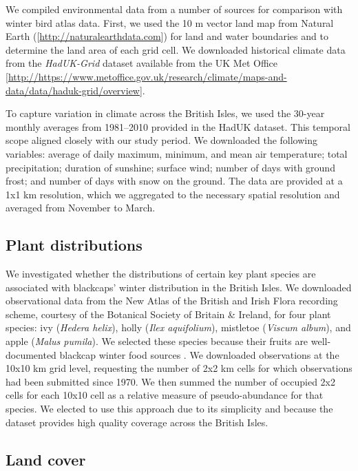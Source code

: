 \documentclass[a4paper, twoside]{templates/ociamthesis}
\begin{document}
We compiled environmental data from a number of sources for comparison with winter bird atlas data. First, we used the 10 m vector land map from Natural Earth ({[}\url{http://naturalearthdata.com}{]}) for land and water boundaries and to determine the land area of each grid cell. We downloaded historical climate data from the \emph{HadUK-Grid} dataset available from the UK Met Office {[}\url{http://https://www.metoffice.gov.uk/research/climate/maps-and-data/data/haduk-grid/overview}{]}.

To capture variation in climate across the British Isles, we used the 30-year monthly averages from 1981--2010 provided in the HadUK dataset. This temporal scope aligned closely with our study period. We downloaded the following variables: average of daily maximum, minimum, and mean air temperature; total precipitation; duration of sunshine; surface wind; number of days with ground frost; and number of days with snow on the ground. The data are provided at a 1x1 km resolution, which we aggregated to the necessary spatial resolution and averaged from November to March.

\hypertarget{plant-distributions}{%
\subsection{Plant distributions}\label{plant-distributions}}

We investigated whether the distributions of certain key plant species are associated with blackcaps' winter distribution in the British Isles. We downloaded observational data from the New Atlas of the British and Irish Flora recording scheme, courtesy of the Botanical Society of Britain \& Ireland, for four plant species:
ivy (\emph{Hedera helix}),
holly (\emph{Ilex aquifolium}),
mistletoe (\emph{Viscum album}),
and apple (\emph{Malus pumila}). We selected these species because their fruits are well-documented blackcap winter food sources \autocite{snowBirdsBerries2010,hardyWinterFoodsBlackcaps1978,leachWinteringBlackcapsBritain1981}.
We downloaded observations at the 10x10 km grid level, requesting the number of 2x2 km cells for which observations had been submitted since 1970. We then summed the number of occupied 2x2 cells for each 10x10 cell as a relative measure of pseudo-abundance for that species. We elected to use this approach due to its simplicity and because the dataset provides high quality coverage across the British Isles.

\hypertarget{land-cover}{%
\subsection{Land cover}\label{land-cover}}
\end{document}
